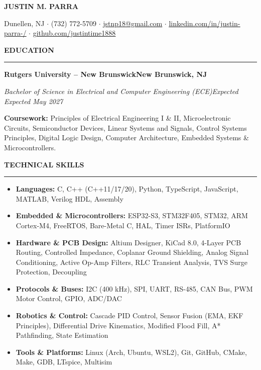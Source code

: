 \documentclass[10pt]{article}
\newcommand{\Section}[1]{%
  \vspace{4.0pt}%
  \textbf{\MakeUppercase{#1}}\par\vspace{-3.5pt}%
  \rule{\linewidth}{0.55pt}\par\vspace{2.5pt}%
}
\newcommand{\Company}[2]{\noindent\textbf{#1}\hfill\textbf{#2}\par}
\newcommand{\RoleDates}[2]{\noindent\textit{#1}\hfill\textit{#2}\par}
\begin{document}
\begin{center}
  {\LARGE \textbf{JUSTIN M. PARRA}}\par\vspace{2.0pt}
  \small Dunellen, NJ $\cdot$ (732) 772-5709 $\cdot$ \href{mailto:jstnp18@gmail.com}{\underline{jstnp18@gmail.com}} $\cdot$ \href{https://linkedin.com/in/justin-parra-/}{\underline{linkedin.com/in/justin-parra-/}} $\cdot$ \href{https://github.com/justintime1888}{\underline{github.com/justintime1888}}
\end{center}
\vspace{-6pt}

\Section{Education}
\Company{Rutgers University -- New Brunswick}{New Brunswick, NJ}
\RoleDates{Bachelor of Science in Electrical and Computer Engineering (ECE)}{Expected Expected May 2027}
\vspace{1pt}
\noindent\small{\textbf{Coursework:} Principles of Electrical Engineering I \& II, Microelectronic Circuits, Semiconductor Devices, Linear Systems and Signals, Control Systems Principles, Digital Logic Design, Computer Architecture, Embedded Systems \& Microcontrollers.}
\vspace{2pt}

\Section{Technical Skills}
\begin{itemize}
  \item \textbf{Languages:} C, C++ (C++11/17/20), Python, TypeScript, JavaScript, MATLAB, Verilog HDL, Assembly
  \item \textbf{Embedded \& Microcontrollers:} ESP32-S3, STM32F405, STM32, ARM Cortex-M4, FreeRTOS, Bare-Metal C, HAL, Timer ISRs, PlatformIO
  \item \textbf{Hardware \& PCB Design:} Altium Designer, KiCad 8.0, 4-Layer PCB Routing, Controlled Impedance, Coplanar Ground Shielding, Analog Signal Conditioning, Active Op-Amp Filters, RLC Transient Analysis, TVS Surge Protection, Decoupling
  \item \textbf{Protocols \& Buses:} I2C (400 kHz), SPI, UART, RS-485, CAN Bus, PWM Motor Control, GPIO, ADC/DAC
  \item \textbf{Robotics \& Control:} Cascade PID Control, Sensor Fusion (EMA, EKF Principles), Differential Drive Kinematics, Modified Flood Fill, A* Pathfinding, State Estimation
  \item \textbf{Tools \& Platforms:} Linux (Arch, Ubuntu, WSL2), Git, GitHub, CMake, Make, GDB, LTspice, Multisim
\end{itemize}
\vspace{2pt}
\end{document}
